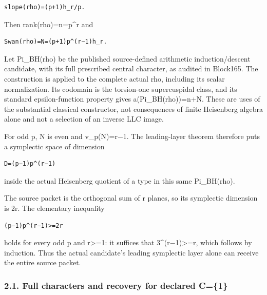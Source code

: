 \begin{Verbatim}[fontsize=\small,breaklines=true,breakanywhere=true]
slope(rho)=(p+1)h_r/p.
\end{Verbatim}

Then rank(rho)=n=p\^{}r and

\begin{Verbatim}[fontsize=\small,breaklines=true,breakanywhere=true]
Swan(rho)=N=(p+1)p^(r−1)h_r.
\end{Verbatim}

Let Pi\_BH(rho) be the published source-defined arithmetic
induction/descent candidate, with its full prescribed central character,
as audited in Block165. The construction is applied to the complete
actual rho, including its scalar normalization. Its codomain is the
torsion-one supercuspidal class, and its standard epsilon-function
property gives a(Pi\_BH(rho))=n+N. These are uses of the substantial
classical constructor, not consequences of finite Heisenberg algebra
alone and not a selection of an inverse LLC image.

For odd p, N is even and v\_p(N)=r−1. The leading-layer theorem
therefore puts a symplectic space of dimension

\begin{Verbatim}[fontsize=\small,breaklines=true,breakanywhere=true]
D=(p−1)p^(r−1)
\end{Verbatim}

inside the actual Heisenberg quotient of a type in this same
Pi\_BH(rho).

The source packet is the orthogonal sum of r planes, so its symplectic
dimension is 2r. The elementary inequality

\begin{Verbatim}[fontsize=\small,breaklines=true,breakanywhere=true]
(p−1)p^(r−1)>=2r
\end{Verbatim}

holds for every odd p and r\textgreater=1: it suffices that
3\^{}(r−1)\textgreater=r, which follows by induction. Thus the actual
candidate's leading symplectic layer alone can receive the entire source
packet.

\hypertarget{odd_capacity-full-characters-and-recovery-for-declared-c1}{%
\subsubsection{2.1. Full characters and recovery for declared
C=\{1\}}\label{odd_capacity-full-characters-and-recovery-for-declared-c1}}

